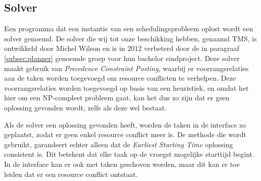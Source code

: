 \subsection{Solver}
\label{subsec:solver}

Een programma dat een instantie van een schedulingsprobleem oplost wordt een solver genoemd. De solver die wij tot onze beschikking hebben, genaamd TMS, is ontwikkeld door Michel Wilson en is in 2012 verbeterd door de in paragraaf \ref{subsec:planner} genoemde groep voor hun bachelor eindproject. Deze solver maakt gebruik van \emph{Precedence Constraint Posting}, waarbij er voorrangsrelaties aan de taken worden toegevoegd om resource conflicten te verhelpen. \cite{seminarium2014} Deze voorrangsrelaties worden toegevoegd op basis van een heuristiek, en omdat het hier om een NP-compleet probleem gaat, kan het dus zo zijn dat er geen oplossing gevonden wordt, zelfs als deze wel bestaat.

Als de solver een oplossing gevonden heeft, worden de taken in de interface zo geplaatst, zodat er geen enkel resource conflict meer is. De methode die wordt gebruikt, garandeert echter alleen dat de \emph{Earliest Starting Time} oplossing consistent is. Dit betekent dat elke taak op de vroegst mogelijke starttijd begint. In de interface kan er ook met taken geschoven worden, maar dit kan er toe leiden dat er een resource conflict ontstaat. 

